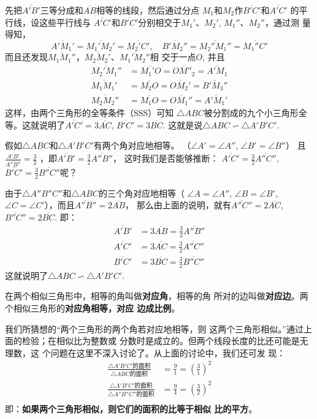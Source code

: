先把$\overline{A'B'}$三等分成和$\overline{AB}$相等的线段，然后通过分点
${M_1}$和$M_2$作$\overline{B'C'}$和$\overline{A'C'}$
的平行线，设这些平行线与
$\overline{A'C'}$和$\overline{B'C'}$分别相交于$M_1'$、$M_2'$, $M_1''$、$M_2''$，通过测
量得知，
\[\overline{A'M_1'}=\overline{M_1'M_2'}=\overline{M_2'C'},\quad \overline{B'M_2''}=\overline{M_2''M_1''}
=\overline{M_1''C'}\]
而且还发现$\overline{M_1M_1''}$，$\overline{M_2M_2'}$、$\overline{M_1'M_2''}$相
交于一点$O$, 并且
\[\begin{split}
	\overline{M_2'M_1''}&=\overline{M_1'O}=\overline{OM''_2}=\overline{A'M_1}\\
	\overline{M_1M_1'}&=\overline{M_2O}=\overline{OM_2'}=\overline{B'M_3''}\\
	\overline{M_2M_2''}&=\overline{M_1O}=\overline{OM_1''}=\overline{A'M_1'}
\end{split}\]
这样，由两个三角形的全等条件（SSS）可知
$\triangle ABC$被分割成的九个小三角形全等。这就说明了$\overline{A'C'}=3\overline{AC}$, $\overline{B'C'}=3\overline{BC}$. 这就是说$\triangle ABC\backsim \triangle A'B'C'$.

假如$\triangle ABC$和$\triangle A'B'C'$有两个角对应地相等。
（$\angle A'=\angle A''$, $\angle B'=\angle B''$）
且$\frac{\overline{A'B'}}{\overline{A''B''}}=\frac{3}{2}$
，即$\overline{A'B'}=\frac{3}{2}\overline{A''B''}$，
这时我们是否能够推断：
$\overline{A'C'}=\frac{3}{2}\overline{A''C''}$, $\overline{B'C'}=\frac{3}{2}\overline{B''C''}$呢？

由于$\triangle A''B''C''$和$\triangle ABC$的三个角对应地相等（
$\angle A=\angle A''$, $\angle B=\angle B'$, $\angle C=\angle C'$），而且$\overline{A''B''}=2\overline{AB}$，
那么由上面的说明，就有$\overline{A''C''}=2\overline{AC}$, $\overline{B''C''}=2\overline{BC}$. 
即：
\[\begin{split}
	\overline{A'B'}&=3\overline{AB}=\frac{3}{2}\overline{A''B''}\\
	\overline{A'C'}&=3\overline{AC}=\frac{3}{2}\overline{A''C''}\\
 \overline{B'C'}&=3\overline{BC}=\frac{3}{2}\overline{B''C''}
\end{split}
	\]
这就说明了$\triangle ABC\backsim \triangle A'B'C'$.

在两个相似三角形中，相等的角叫做\textbf{对应角}，相等的角
所对的边叫做\textbf{对应边}。两个相似三角形的\textbf{对应角相等，对应
边成比例}。

我们所猜想的“两个三角形的两个角若对应地相等，则
这两个三角形相似。”通过上面的检验；在相似比为整数或
分数时是成立的。但两个线段长度的比还可能是无理数，这
个问题在这里不深入讨论了。从上面的讨论中，我们还可发
现：
\[\begin{split}
	\frac{\triangle A'B'C'\text{的面积} }{\triangle ABC\text{的面积}}&=\frac{9}{1}=\left(\frac{3}{1}\right)^2\\
	\frac{\triangle A'B'C'\text{的面积} }{\triangle A''B''C''\text{的面积}}&=\frac{9}{4}=\left(\frac{3}{2}\right)^2\\
\end{split}\]
即：\textbf{如果两个三角形相似，则它们的面积的比等于相似
比的平方}。


